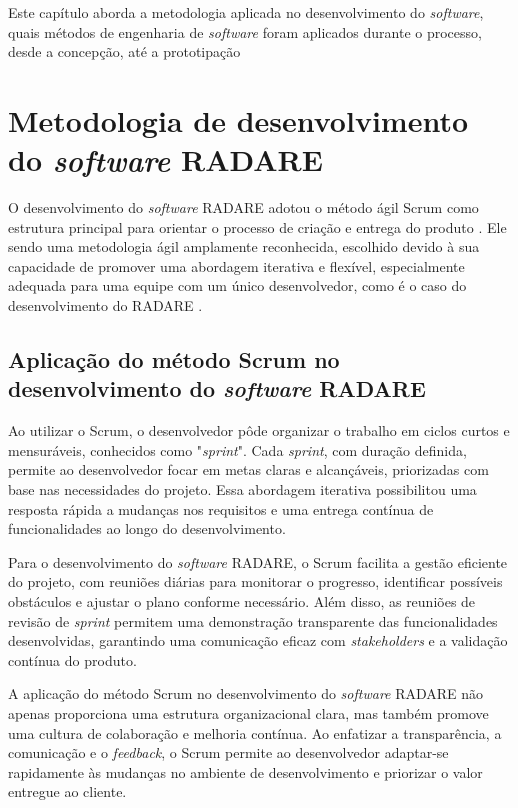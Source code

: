 \label{Cap:Metodologia}

Este capítulo aborda a metodologia aplicada no desenvolvimento do \textit{software}, quais métodos de engenharia de \textit{software} foram aplicados durante o processo, desde a concepção, até a prototipação

\section{Metodologia de desenvolvimento do \textit{software} RADARE}

O desenvolvimento do \textit{software} RADARE adotou o método ágil Scrum como estrutura principal para orientar o processo de criação e entrega do produto \cite{softwareengreq}. Ele sendo uma metodologia ágil amplamente reconhecida, escolhido devido à sua capacidade de promover uma abordagem iterativa e flexível, especialmente adequada para uma equipe com um único desenvolvedor, como é o caso do desenvolvimento do RADARE \cite{scrum}.

\subsection{Aplicação do método Scrum no desenvolvimento do \textit{software} RADARE}

Ao utilizar o Scrum, o desenvolvedor pôde organizar o trabalho em ciclos curtos e mensuráveis, conhecidos como "\textit{sprint}". Cada \textit{sprint}, com duração definida, permite ao desenvolvedor focar em metas claras e alcançáveis, priorizadas com base nas necessidades do projeto. Essa abordagem iterativa possibilitou uma resposta rápida a mudanças nos requisitos e uma entrega contínua de funcionalidades ao longo do desenvolvimento.
        
Para o desenvolvimento do \textit{software} RADARE, o Scrum facilita a gestão eficiente do projeto, com reuniões diárias para monitorar o progresso, identificar possíveis obstáculos e ajustar o plano conforme necessário. Além disso, as reuniões de revisão de \textit{sprint} permitem uma demonstração transparente das funcionalidades desenvolvidas, garantindo uma comunicação eficaz com \textit{stakeholders} e a validação contínua do produto.
        
A aplicação do método Scrum no desenvolvimento do \textit{software} RADARE não apenas proporciona uma estrutura organizacional clara, mas também promove uma cultura de colaboração e melhoria contínua. Ao enfatizar a transparência, a comunicação e o \textit{feedback}, o Scrum permite ao desenvolvedor adaptar-se rapidamente às mudanças no ambiente de desenvolvimento e priorizar o valor entregue ao cliente.
        
